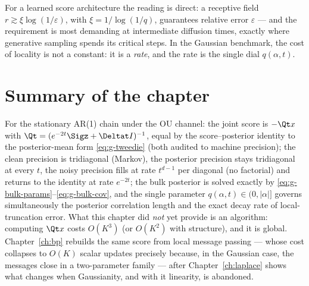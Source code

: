 For a learned score architecture the reading is direct: a receptive field
$r \gtrsim \xi \log(1/\varepsilon)$, with $\xi = 1/\log(1/q)$, guarantees
relative error $\varepsilon$ --- and the requirement is most demanding at
intermediate diffusion times, exactly where generative sampling spends its
critical steps. In the Gaussian benchmark, the cost of locality is not a
constant: it is a \emph{rate}, and the rate is the single dial
$q(\alpha, t)$.

\section{Summary of the chapter}

For the stationary AR(1) chain under the OU channel: the joint score is
$-\Qt x$ with $\Qt = (e^{-2t}\Sigz + \Deltat I)^{-1}$, equal by the
score--posterior identity to the posterior-mean form \eqref{eq:g-tweedie}
(both audited to machine precision); the clean precision is tridiagonal (Markov), the posterior
precision stays tridiagonal at every $t$, the noisy precision fills at rate
$t^{d-1}$ per diagonal (no factorial) and returns to the identity at rate
$e^{-2t}$; the bulk posterior is solved exactly by
\eqref{eq:g-bulk-params}--\eqref{eq:g-bulk-cov}, and the single parameter
$q(\alpha, t) \in (0, |\alpha|]$ governs simultaneously the posterior
correlation length and the exact decay rate of local-truncation error. What
this chapter did \emph{not} yet provide is an algorithm: computing
$\Qt x$ costs $O(K^3)$ (or $O(K^2)$ with structure), and it is global.
Chapter~\ref{ch:bp} rebuilds the same score from local message passing ---
whose cost collapses to $O(K)$ scalar updates precisely because, in the
Gaussian case, the messages close in a two-parameter family --- after
Chapter~\ref{ch:laplace} shows what changes when Gaussianity, and with it
linearity, is abandoned.
